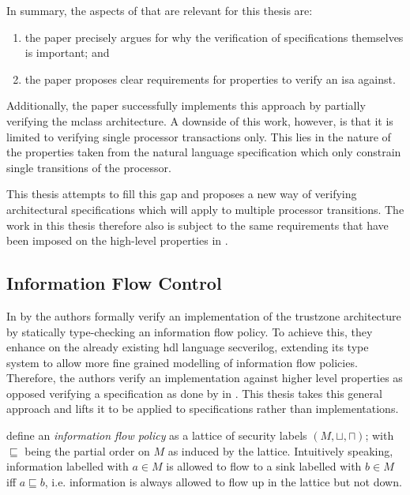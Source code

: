 In summary, the aspects of \cite{Reid17} that are relevant for this thesis are:
\begin{enumerate}[label=\alph*)]
    \item the paper precisely argues for why the verification of specifications themselves is important; and
    \item the paper proposes clear requirements for properties to verify an \gls{isa} against.
\end{enumerate}

Additionally, the paper successfully implements this approach by partially verifying the \gls{mclass} architecture.
A downside of this work, however, is that it is limited to verifying single processor transactions only.
This lies in the nature of the properties taken from the natural language specification which only constrain single transitions of the processor.

This thesis attempts to fill this gap and proposes a new way of verifying architectural specifications which will apply to multiple processor transitions.
The work in this thesis therefore also is subject to the same requirements that have been imposed on the high-level properties in \cite{Reid17}.

\subsection{Information Flow Control}
\label{sec:ifc}


In  \cite{Ferraiuolo17} by \citeauthor{Ferraiuolo17} the authors formally verify an implementation of the \gls{trustzone} architecture by statically type-checking an information flow policy.
To achieve this, they enhance on the already existing \gls{hdl} language \gls{secverilog}, extending its type system to allow more fine grained modelling of information flow policies.
Therefore, the authors verify an implementation against higher level properties as opposed verifying a specification as done by \citeauthor{Reid17} in \cite{Reid17}.
This thesis takes this general approach and lifts it to be applied to specifications rather than implementations.

\citeauthor{Ferraiuolo17} define an \textit{information flow policy} as a lattice of security labels $ (M, \sqcup, \sqcap) $; with $ \sqsubseteq $ being the partial order on $ M $ as induced by the lattice.
Intuitively speaking, information labelled with $ a \in M $ is allowed to flow to a sink labelled with $ b \in M $ iff $ a \sqsubseteq b $, i.e. information is always allowed to flow up in the lattice but not down.

